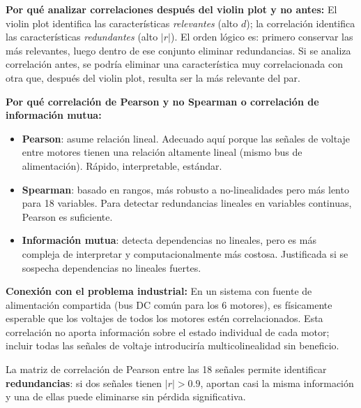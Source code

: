 \documentclass[12pt,a4paper]{article}
\begin{document}
\begin{whybox}
\textbf{Por qué analizar correlaciones después del violin plot y no antes:}
El violin plot identifica las características \emph{relevantes} (alto $d$); la
correlación identifica las características \emph{redundantes} (alto $|r|$). El
orden lógico es: primero conservar las más relevantes, luego dentro de ese conjunto
eliminar redundancias. Si se analiza correlación antes, se podría eliminar una
característica muy correlacionada con otra que, después del violin plot, resulta
ser la más relevante del par.

\textbf{Por qué correlación de Pearson y no Spearman o correlación de información mutua:}
\begin{itemize}[leftmargin=1.5em]
  \item \textbf{Pearson}: asume relación lineal. Adecuado aquí porque las señales
    de voltaje entre motores tienen una relación altamente lineal (mismo bus de
    alimentación). Rápido, interpretable, estándar.
  \item \textbf{Spearman}: basado en rangos, más robusto a no-linealidades pero
    más lento para 18 variables. Para detectar redundancias lineales en variables
    continuas, Pearson es suficiente.
  \item \textbf{Información mutua}: detecta dependencias no lineales, pero es más
    compleja de interpretar y computacionalmente más costosa. Justificada si se
    sospecha dependencias no lineales fuertes.
\end{itemize}

\textbf{Conexión con el problema industrial:}
En un sistema con fuente de alimentación compartida (bus DC común para los 6 motores),
es físicamente esperable que los voltajes de todos los motores estén correlacionados.
Esta correlación no aporta información sobre el estado individual de cada motor;
incluir todas las señales de voltaje introduciría multicolinealidad sin beneficio.
\end{whybox}

La matriz de correlación de Pearson entre las 18 señales permite identificar
\textbf{redundancias}: si dos señales tienen $|r| > 0.9$, aportan casi la misma
información y una de ellas puede eliminarse sin pérdida significativa.
\end{document}
